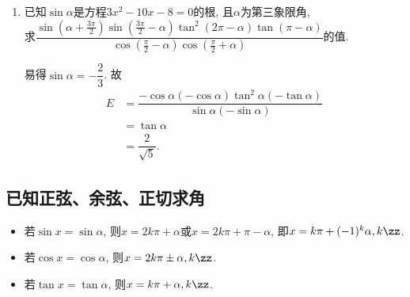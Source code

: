 \begin{enumerate}
\item 已知$\sin\alpha$是方程$3x^2-10x-8=0$的根, 且$\alpha$为第三象限角, \\
求$\dfrac{\sin(\alpha+\frac{3\pi}{2})\sin(\frac{3\pi}{2}-\alpha)\tan^2(2\pi-\alpha)\tan(\pi-\alpha)}
{\cos(\frac{\pi}{2}-\alpha)\cos(\frac{\pi}{2}+\alpha)}$的值. 
\begin{jieda}
易得$\sin\alpha=-\dfrac{2}{3}$. 
故
\begin{align*}
E & = \dfrac{-\cos\alpha(-\cos\alpha)\tan^2\alpha(-\tan\alpha)}{\sin\alpha(-\sin\alpha)}\\
& = \tan\alpha\\
& = \dfrac{2}{\sqrt{5}}.
\end{align*}
\end{jieda}

\end{enumerate}




\subsection{已知正弦、余弦、正切求角}

\begin{tcolorbox}
\zsd 
\begin{itemize}
\item 若$\sin{x}=\sin\alpha$, 则$x=2k\pi+\alpha$或$x=2k\pi+\pi-\alpha$, 即$x=k\pi+(-1)^k\alpha, k\zz$. 
\item 若$\cos{x}=\cos\alpha$, 则$x=2k\pi\pm\alpha, k\zz$. 
\item 若$\tan{x}=\tan\alpha$, 则$x=k\pi+\alpha, k\zz$. 
\end{itemize}
\end{tcolorbox}

